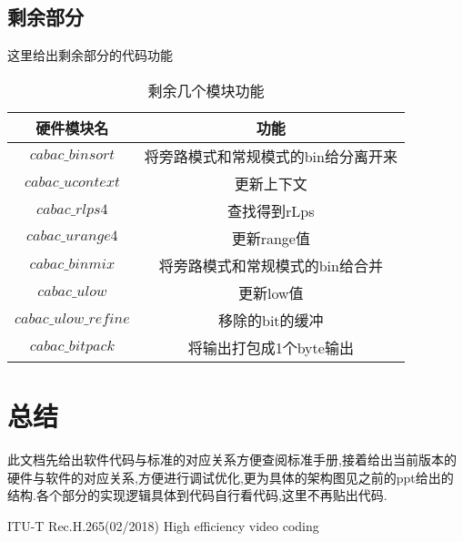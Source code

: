 \documentclass[UTF8,a4paper,12pt]{ctexart}
\newcommand{\wuhao}{\fontsize{10.5pt}{10.5pt}\selectfont}
\begin{document}
\subsection{剩余部分}
这里给出剩余部分的代码功能
\begin{table}[H] \wuhao             %
   \centering
  \caption{剩余几个模块功能}\label{tab7}
  \begin{tabular}{c|c}
    \toprule                  %
    硬件模块名 & 功能 \\
    \hline                  %
    $cabac\_binsort$ & 将旁路模式和常规模式的bin给分离开来 \\
    $cabac\_ucontext$ & 更新上下文 \\
    $cabac\_rlps4$ & 查找得到rLps \\
    $cabac\_urange4$ & 更新range值 \\
    $cabac\_binmix$ & 将旁路模式和常规模式的bin给合并 \\
    $cabac\_ulow$ & 更新low值 \\
    $cabac\_ulow\_refine$ & 移除的bit的缓冲 \\
    $cabac\_bitpack$ & 将输出打包成1个byte输出 \\
    \bottomrule                %
  \end{tabular}
\end{table}

\section{总结}
此文档先给出软件代码与标准的对应关系方便查阅标准手册,接着给出当前版本的硬件与软件的对应关系,方便进行调试优化,更为具体的架构图见之前的ppt给出的结构.各个部分的实现逻辑具体到代码自行看代码,这里不再贴出代码.

\begin{thebibliography}{99}  
ITU-T Rec.H.265(02/2018) High efficiency video coding
\end{thebibliography}
\end{document}
